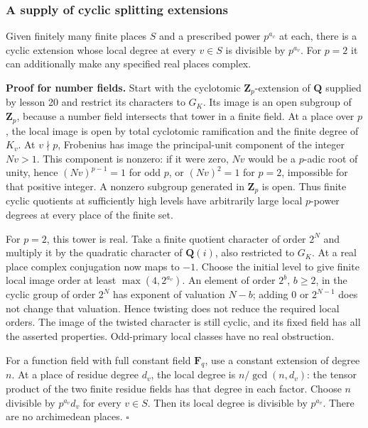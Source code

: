 \documentclass[11pt,a4paper]{article}
\begin{document}
\subsubsection{A supply of cyclic splitting
extensions}\label{a-supply-of-cyclic-splitting-extensions}

Given finitely many finite places \(S\) and a prescribed power
\(p^{a_v}\) at each, there is a cyclic extension whose local degree at
every \(v\in S\) is divisible by \(p^{a_v}\). For \(p=2\) it can
additionally make any specified real places complex.

\textbf{Proof for number fields.} Start with the cyclotomic
\(\mathbf Z_p\)-extension of \(\mathbf Q\) supplied by lesson 20 and
restrict its characters to \(G_K\). Its image is an open subgroup of
\(\mathbf Z_p\), because a number field intersects that tower in a
finite field. At a place over \(p\), the local image is open by total
cyclotomic ramification and the finite degree of \(K_v\). At
\(v\nmid p\), Frobenius has image the principal-unit component of the
integer \(Nv>1\). This component is nonzero: if it were zero, \(Nv\)
would be a \(p\)-adic root of unity, hence \((Nv)^{p-1}=1\) for odd
\(p\), or \((Nv)^2=1\) for \(p=2\), impossible for that positive
integer. A nonzero subgroup generated in \(\mathbf Z_p\) is open. Thus
finite cyclic quotients at sufficiently high levels have arbitrarily
large local \(p\)-power degrees at every place of the finite set.

For \(p=2\), this tower is real. Take a finite quotient character of
order \(2^N\) and multiply it by the quadratic character of
\(\mathbf Q(i)\), also restricted to \(G_K\). At a real place complex
conjugation now maps to \(-1\). Choose the initial level to give finite
local image order at least \(\max(4,2^{a_v})\). An element of order
\(2^b\), \(b\geq2\), in the cyclic group of order \(2^N\) has exponent
of valuation \(N-b\); adding 0 or \(2^{N-1}\) does not change that
valuation. Hence twisting does not reduce the required local orders. The
image of the twisted character is still cyclic, and its fixed field has
all the asserted properties. Odd-primary local classes have no real
obstruction.

For a function field with full constant field \(\mathbf F_q\), use a
constant extension of degree \(n\). At a place of residue degree
\(d_v\), the local degree is \(n/\gcd(n,d_v)\): the tensor product of
the two finite residue fields has that degree in each factor. Choose
\(n\) divisible by \(p^{a_v}d_v\) for every \(v\in S\). Then its local
degree is divisible by \(p^{a_v}\). There are no archimedean places.
\(\square\)
\end{document}
